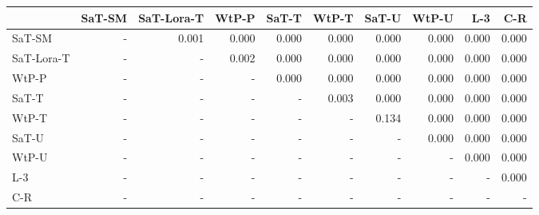 \begin{tabular}{lrrrrrrrrr}
\toprule
 & SaT-SM & SaT-Lora-T & WtP-P & SaT-T & WtP-T & SaT-U & WtP-U & L-3 & C-R \\
\midrule
SaT-SM & - & 0.001 & 0.000 & 0.000 & 0.000 & 0.000 & 0.000 & 0.000 & 0.000 \\
SaT-Lora-T & - & - & 0.002 & 0.000 & 0.000 & 0.000 & 0.000 & 0.000 & 0.000 \\
WtP-P & - & - & - & 0.000 & 0.000 & 0.000 & 0.000 & 0.000 & 0.000 \\
SaT-T & - & - & - & - & 0.003 & 0.000 & 0.000 & 0.000 & 0.000 \\
WtP-T & - & - & - & - & - & 0.134 & 0.000 & 0.000 & 0.000 \\
SaT-U & - & - & - & - & - & - & 0.000 & 0.000 & 0.000 \\
WtP-U & - & - & - & - & - & - & - & 0.000 & 0.000 \\
L-3 & - & - & - & - & - & - & - & - & 0.000 \\
C-R & - & - & - & - & - & - & - & - & - \\
\bottomrule
\end{tabular}

